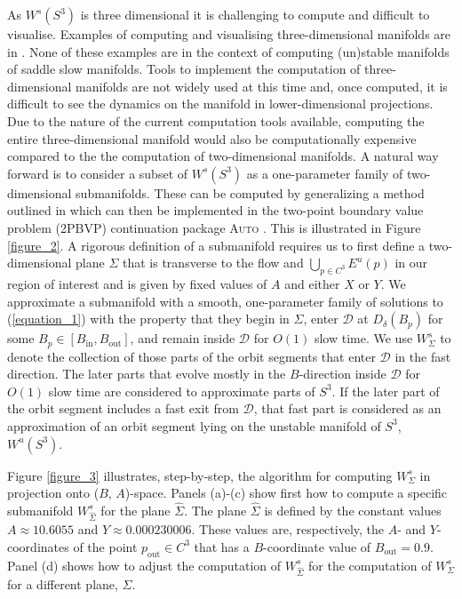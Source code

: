\documentclass{ws-ijbc}
\begin{document}
As $W^{s}(S^3)$ is three dimensional it is challenging to compute and difficult to visualise.  Examples of computing and visualising three-dimensional manifolds are in \cite{Initial_conditions_volume, Invariant_tori_again, Invariant_tori}.  None of these examples are in the context of computing (un)stable manifolds of saddle slow manifolds.  Tools to implement the computation of three-dimensional manifolds are not widely used at this time and, once computed, it is difficult to see the dynamics on the manifold in lower-dimensional projections.  Due to the nature of the current computation tools available, computing the entire three-dimensional manifold would also be computationally expensive compared to the the computation of two-dimensional manifolds.  A natural way forward is to consider a subset of $W^{s}(S^3)$ as a one-parameter family of two-dimensional submanifolds.  These can be computed by generalizing a method outlined in \cite{Saeed_Paper} which can then be implemented in the two-point boundary value problem (2PBVP) continuation package \textsc{Auto} \cite{AUTO}.  This is illustrated in Figure \ref{figure_2}.  A rigorous definition of a submanifold requires us to first define a two-dimensional plane $\Sigma$ that is transverse to the flow and $\bigcup_{p \in C^3} E^u(p)$ in our region of interest and is given by fixed values of $A$ and either $X$ or $Y$.  We approximate a submanifold with a smooth, one-parameter family of solutions to (\ref{equation_1}) with the property that they begin in $\Sigma$, enter $\mathscr{D}$ at $D_{\delta}(B_p)$ for some $B_p \in [B_{\text{in}}, B_{\text{out}}]$, and remain inside $\mathscr{D}$ for $O(1)$ slow time.  We use $W^{s}_{\Sigma}$ to denote the collection of those parts of the orbit segments that enter $\mathscr{D}$ in the fast direction.  The later parts that evolve mostly in the $B$-direction inside $\mathscr{D}$ for $O(1)$ slow time are considered to approximate parts of $S^3$.  If the later part of the orbit segment includes a fast exit from $\mathscr{D}$, that fast part is considered as an approximation of an orbit segment lying on the unstable manifold of $S^3$, $W^{u}(S^3)$.

Figure \ref{figure_3} illustrates, step-by-step, the algorithm for computing $W^s_\Sigma$ in projection onto ($B$, $A$)-space.  Panels (a)-(c) show first how to compute a specific submanifold $W^s_{\widehat{\Sigma}}$ for the plane $\widehat{\Sigma}$.  The plane $\widehat{\Sigma}$ is defined by the constant values $A \approx 10.6055$ and $Y \approx 0.000230006$.  These values are, respectively, the $A$- and $Y$-coordinates of the point $p_{\text{out}} \in C^3$ that has a $B$-coordinate value of $B_{\text{out}}=0.9$.  Panel (d) shows how to adjust the computation of $W^{s}_{\widehat{\Sigma}}$ for the computation of $W^{s}_\Sigma$ for a different plane, $\Sigma$.
\end{document}
